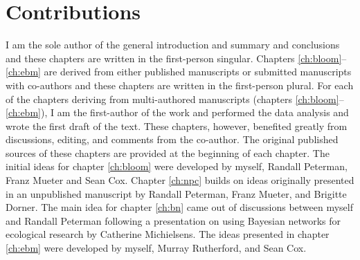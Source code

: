 \section{Contributions}

I am the sole author of the general introduction and summary and conclusions and
these chapters are written in the first-person singular. Chapters
\ref{ch:bloom}--\ref{ch:ebm} are derived from either published manuscripts
or submitted manuscripts with co-authors and these chapters are written in the
first-person plural. For each of the chapters deriving from multi-authored
manuscripts (chapters \ref{ch:bloom}--\ref{ch:ebm}), I am the first-author
of the work and performed the data analysis and wrote the first draft of the
text. These chapters, however, benefited greatly from discussions, editing, and
comments from the co-author. The original published sources of these chapters
are provided at the beginning of each chapter. The initial ideas for chapter
\ref{ch:bloom} were developed by myself, Randall Peterman, Franz Mueter and
Sean Cox. Chapter \ref{ch:npc} builds on ideas originally presented in an
unpublished manuscript by Randall Peterman, Franz Mueter, and Brigitte Dorner.
The main idea for chapter \ref{ch:bn} came out of discussions between myself
and Randall Peterman following a presentation on using Bayesian networks for
ecological research by Catherine Michielsens. The ideas presented in chapter
\ref{ch:ebm} were developed by myself, Murray Rutherford, and Sean Cox.


